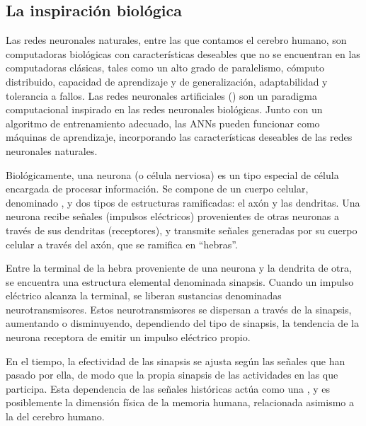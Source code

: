 %
%
\subsection{La inspiración biológica}
%
Las redes neuronales naturales, entre las que contamos el cerebro
humano, son computadoras biológicas con características deseables que
no se encuentran en las computadoras clásicas, tales como un alto
grado de paralelismo, cómputo distribuido, capacidad de aprendizaje y
de generalización, adaptabilidad y tolerancia a fallos.  Las redes
neuronales artificiales () son
un paradigma computacional inspirado en las redes neuronales
biológicas. Junto con un algoritmo de entrenamiento adecuado, las
ANNs pueden funcionar como máquinas de aprendizaje, incorporando
las características deseables de las redes neuronales naturales.

Biológicamente, una neurona (o célula nerviosa) es un tipo especial de
célula encargada de procesar información.  Se compone de un cuerpo
celular, denominado , y dos tipos de estructuras ramificadas:
el axón y las dendritas. Una neurona recibe señales (impulsos
eléctricos) provenientes de otras neuronas a través de sus dendritas
(receptores), y transmite señales generadas por su cuerpo celular a
través del axón, que se ramifica en ``hebras''.

Entre la terminal de la hebra proveniente de una neurona y la
dendrita de otra, se encuentra una estructura elemental denominada
sinapsis.  Cuando un impulso eléctrico alcanza la terminal,
se liberan sustancias denominadas neurotransmisores. Estos
neurotransmisores se dispersan a través de la sinapsis, aumentando o
disminuyendo, dependiendo del tipo de sinapsis, la tendencia de la
neurona receptora de emitir un impulso eléctrico propio.

En el tiempo, la efectividad de las sinapsis se ajusta según las
señales que han pasado por ella, de modo que la propia sinapsis
 de las actividades en las que participa. Esta dependencia
de las señales históricas actúa como una , y es
posiblemente la dimensión física de la memoria humana, relacionada
asimismo a la  del cerebro humano.
